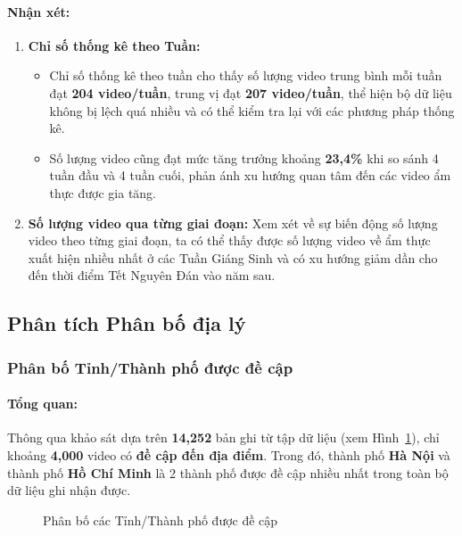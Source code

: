 \paragraph{Nhận xét:}
\begin{enumerate}
    \item \textbf{Chỉ số thống kê theo Tuần:}
    \begin{itemize}
        \item Chỉ số thống kê theo tuần cho thấy số lượng video trung bình mỗi tuần đạt \textbf{204 video/tuần}, trung vị đạt \textbf{207 video/tuần}, thể hiện bộ dữ liệu không bị lệch quá nhiều và có thể kiểm tra lại với các phương pháp thống kê.
        
        \item Số lượng video cũng đạt mức tăng trưởng khoảng \textbf{23,4\%} khi so sánh 4 tuần đầu và 4 tuần cuối, phản ánh xu hướng quan tâm đến các video ẩm thực được gia tăng.
    \end{itemize}

    \item \textbf{Số lượng video qua từng giai đoạn:} Xem xét về sự biến động số lượng video theo từng giai đoạn, ta có thể thấy được số lượng video về ẩm thực xuất hiện nhiều nhất ở các Tuần Giáng Sinh và có xu hướng giảm dần cho đến thời điểm Tết Nguyên Đán vào năm sau.
\end{enumerate}

\subsection{Phân tích Phân bố địa lý}

\subsubsection{Phân bố Tỉnh/Thành phố được đề cập}

\paragraph{Tổng quan:}
Thông qua khảo sát dựa trên \textbf{14,252} bản ghi từ tập dữ liệu (xem Hình~\ref{fig:tinh_thanhpho}), chỉ khoảng \textbf{4,000} video có \textbf{đề cập đến địa điểm}. Trong đó, thành phố \textbf{Hà Nội} và thành phố \textbf{Hồ Chí Minh} là 2 thành phố được đề cập nhiều nhất trong toàn bộ dữ liệu ghi nhận được.

\begin{figure}[H]
    \centering
    \caption{Phân bố các Tỉnh/Thành phố được đề cập}
    \label{fig:tinh_thanhpho}
\end{figure}

